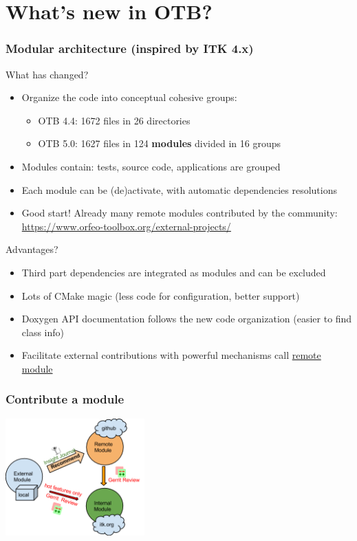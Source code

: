 \documentclass[8pt]{beamer}
\begin{document}
\section{What's new in OTB?}

\begin{frame}
\frametitle{Modular architecture (inspired by ITK 4.x)}
\begin{block}{What has changed?}
\begin{itemize}
\item  Organize the code into conceptual cohesive groups:
  \begin{itemize}
    \item OTB 4.4: 1672 files in 26 directories
    \item OTB 5.0: 1627 files in 124 \textbf{modules} divided in 16 groups
  \end{itemize}
\item Modules contain: tests, source code, applications are grouped
\item Each module can be (de)activate, with automatic dependencies resolutions
\item Good start! Already many remote modules contributed by the community: \url{https://www.orfeo-toolbox.org/external-projects/}
\end{itemize}
\end{block}

\begin{block}{Advantages?}
\begin{itemize}
\item Third part dependencies are integrated as modules and can be excluded
\item Lots of CMake magic (less code for configuration, better support)
\item Doxygen API documentation follows the new code organization (easier to
  find class info)
\item Facilitate external contributions with powerful mechanisms call
  \href{https://www.orfeo-toolbox.org/external-projects/}{\alert{remote module}}
\end{itemize}
\end{block}
\end{frame}

\begin{frame}
\frametitle{Contribute a module}
\begin{center}
 \includegraphics[width=0.4\textwidth]{images/itk-remote-module.png}
\end{center}
\end{frame}
\end{document}
